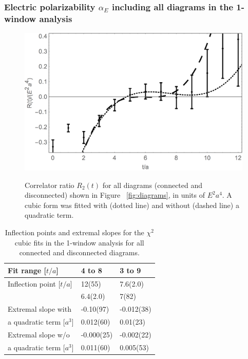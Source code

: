 
\subsubsection{Electric polarizability $\alpha_E$ including all diagrams in the 1-window analysis}
\label{3571wAll}

\begin{figure}[H]
\centering
\includegraphics[width=.65\linewidth]{figures/shshQuadCSFull.png}\\
\caption{Correlator ratio $R_2(t)$ for all diagrams (connected and disconnected) shown in Figure ~\ref{fig:diagrams}, in units of $E^2a^4$. A cubic form was fitted with (dotted line) and without (dashed line) a quadratic term.}
\label{fig:1walphafull}
\end{figure}

\begin{table}[H]
\begin{center}
    \begin{tabular}{ | l | l | l | }
    \hline
     Fit range [$t/a$]   			& 4 to 8   & 3 to 9  \\ \hline
     Inflection point [$t/a$]		& 12(55)   & 7.6(2.0)    \\ 
     						& 6.4(2.0)	& 7(82) \\\hline
     Extremal slope with   		&  -0.10(97)  &  -0.012(38) \\
     a quadratic term [$a^3$]	& 0.012(60) & 0.01(23) \\ \hline
     Extremal slope w/o		&  -0.000(25)   &  -0.002(22) \\
     a quadratic term [$a^3$]	& 0.011(60) & 0.005(53) \\ \hline
    \end{tabular}
\end{center}
\caption{Inflection points and extremal slopes for the $\chi^2$ cubic fits in the 1-window analysis for all connected and disconnected diagrams. }
\label{tab:1walphafull}
\end{table}

